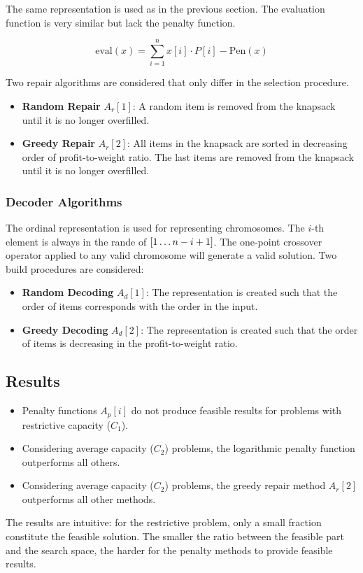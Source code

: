 \documentclass[../main.tex]{subfiles}
\begin{document}
The same representation is used as in the previous section. The evaluation function is very similar but lack the
penalty function.

\begin{equation}
\text{eval}(x) = \sum^n_{i=1} x[i] \cdot P[i] - \text{Pen}(x)
\end{equation}

Two repair algorithms are considered that only differ in the selection procedure.

\begin{itemize}
	\item \textbf{Random Repair} $A_r[1]$: A random item is removed from the knapsack until it is no longer overfilled.
	\item \textbf{Greedy Repair} $A_r[2]$: All items in the knapsack are sorted in decreasing order of profit-to-weight
	ratio. The last items are removed from the knapsack until it is no longer overfilled.
\end{itemize}

\subsubsection{Decoder Algorithms}

The ordinal representation is used for representing chromosomes. The $i$-th element is always in the rande of $[1
\mathellipsis n - i + 1]$. The one-point crossover operator applied to any valid chromosome will generate a valid
solution. Two build procedures are considered:

\begin{itemize}
	\item \textbf{Random Decoding} $A_d[1]$: The representation is created such that the order of items corresponds
	with the order in the input.
	\item \textbf{Greedy Decoding} $A_d[2]$: The representation is created such that the order of items is decreasing
	in the profit-to-weight ratio.
\end{itemize}

\subsection{Results}

\begin{itemize}
	\item Penalty functions $A_p[i]$ do not produce feasible results for problems with restrictive capacity ($C_1$).
	\item Considering average capacity ($C_2$) problems, the logarithmic penalty function outperforms all others.
	\item Considering average capacity ($C_2$) problems, the greedy repair method $A_r[2]$ outperforms all other
	methods.
\end{itemize}

The results are intuitive: for the restrictive problem, only a small fraction constitute the feasible solution. The
smaller the ratio between the feasible part and the search space, the harder for the penalty methods to provide
feasible results.
\end{document}
